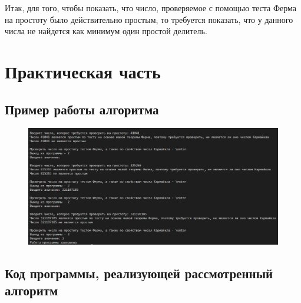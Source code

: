 \documentclass[bachelor, och, labwork]{shiza}
\begin{document}
Итак, для того, чтобы показать, что число, проверяемое с помощью теста Ферма на
простоту было действительно простым, то требуется показать, что у данного числа
не найдется как минимум один простой делитель.


\section{Практическая часть}
\subsection{Пример работы алгоритма}
\begin{figure}[H]
    \centering
    \includegraphics[width=1.0\textwidth]{pic1.png}
    \caption{}
\end{figure}

    \subsection{Код программы, реализующей рассмотренный алгоритм}
        \inputminted{python}{lab5.py}
\end{document}
